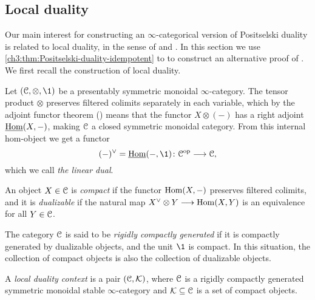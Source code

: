 

\subsection{Local duality}
\label{ch3:ssec:local-duality}

Our main interest for constructing an $\infty$-categorical version of Positselski duality is related to local duality, in the sense of \cite{hovey-palmiery-strickland_97} and \cite{barthel-heard-valenzuela_2018}. In this section we use \cref{ch3:thm:Positselski-duality-idempotent} to to construct an alternative proof of \cite[2.21]{barthel-heard-valenzuela_2018}. We first recall the construction of local duality. 

Let $(\C, \otimes, \1)$ be a presentably symmetric monoidal $\infty$-category. The tensor product $\otimes$ preserves filtered colimits separately in each variable, which by the adjoint functor theorem (\cite[5.5.2.9]{lurie_09}) means that the functor $X\otimes (-)$ has a right adjoint $\operatorname{\underline{Hom}}(X, -)$, making $\EuScript{C}$ a closed symmetric monoidal category. From this internal hom-object we get a functor 
\[(-)^\vee = \iHom(-, \1)\: \C\op \to \C,\] 
which we call \emph{the linear dual}. 

\begin{definition}
    An object $X\in \EuScript{C}$ is \emph{compact} if the functor $\operatorname{Hom}(X, -)$ preserves filtered colimits, and it is \emph{dualizable} if the natural map $X^\vee \otimes Y \longrightarrow \operatorname{Hom}(X,Y)$ is an equivalence for all $Y\in \EuScript{C}$. 
\end{definition}

The category $\EuScript{C}$ is said to be \emph{rigidly compactly generated} if it is compactly generated by dualizable objects, and the unit $\1$ is compact. In this situation, the collection of compact objects is also the collection of dualizable objects. 

\begin{definition}
    A \emph{local duality context} is a pair $(\EuScript{C}, \mathcal{K})$, where $\EuScript{C}$ is a rigidly compactly generated symmetric monoidal stable $\infty$-category and $\mathcal{K}\subseteq \EuScript{C}$ is a set of compact objects. 
\end{definition}

